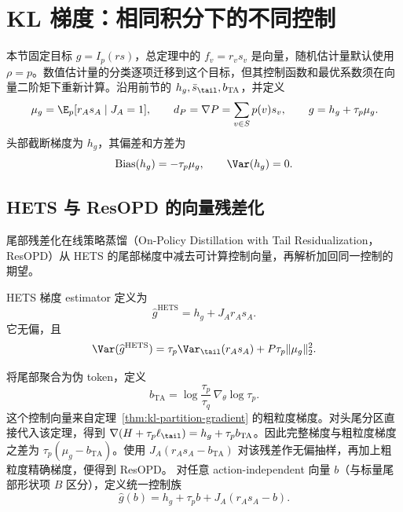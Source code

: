 \section{KL 梯度：相同积分下的不同控制}
\label{sec:kl-vector}
本节固定目标 $g=I_p(rs)$，总定理中的 $f_v=r_vs_v$ 是向量，随机估计量默认使用 $\rho=p$。数值估计量的分类逐项迁移到这个目标，但其控制函数和最优系数须在向量二阶矩下重新计算。沿用前节的 $h_g,\bar s_\tail,b_{\mathrm{TA}}$，并定义
\[
 \mu_g=\E_p[r_As_A\mid J_A=1],\qquad
 d_P=\nabla P=\sum_{v\in S}p(v)s_v,\qquad g=h_g+\tau_p\mu_g.
\]
头部截断梯度为 $h_g$，其偏差和方差为
\begin{equation}
 \operatorname{Bias}(h_g)=-\tau_p\mu_g,
 \qquad \Var(h_g)=0.
 \label{eq:chapter3-head-grad-bias}
\end{equation}

\subsection{HETS 与 ResOPD 的向量残差化}

尾部残差化在线策略蒸馏（On-Policy Distillation with Tail Residualization，ResOPD）从 HETS 的尾部梯度中减去可计算控制向量，再解析加回同一控制的期望。

HETS 梯度 estimator 定义为
\begin{equation}
 \widehat g^{\mathrm{HETS}}=h_g+J_A r_As_A.
 \label{eq:chapter3-hets-grad}
\end{equation}
它无偏，且
\begin{equation}
 \Var(\widehat g^{\mathrm{HETS}})
 =\tau_p\Var_{\tail}(r_As_A)+P\tau_p\lVert\mu_g\rVert_2^2.
 \label{eq:chapter3-hets-var}
\end{equation}

将尾部聚合为伪 token，定义
\begin{equation}
 b_{\mathrm{TA}}=\log\frac{\tau_p}{\tau_q}\,\nabla_\theta\log\tau_p.
 \label{eq:chapter3-resopd-control}
\end{equation}
这个控制向量来自定理~\ref{thm:kl-partition-gradient} 的粗粒度梯度。对头尾分区直接代入该定理，得到 $\nabla(H+\tau_p\ell_{\tail})=h_g+\tau_pb_{\mathrm{TA}}$。因此完整梯度与粗粒度梯度之差为 $\tau_p(\mu_g-b_{\mathrm{TA}})$。使用 $J_A(r_As_A-b_{\mathrm{TA}})$ 对该残差作无偏抽样，再加上粗粒度精确梯度，便得到 ResOPD。
对任意 action-independent 向量 $b$（与标量尾部形状项 $B$ 区分），定义统一控制族
\begin{equation}
 \widehat g(b)=h_g+\tau_pb+J_A(r_As_A-b).
 \label{eq:chapter3-control-family}
\end{equation}

